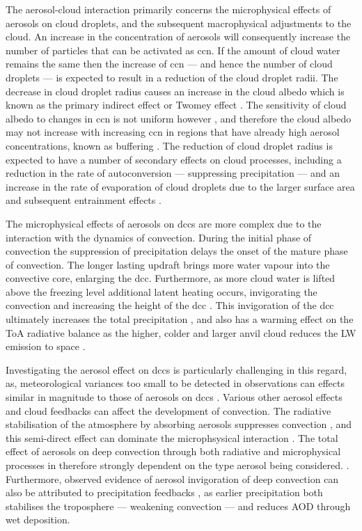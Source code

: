 The aerosol-cloud interaction primarily concerns the microphysical effects of aerosols on cloud droplets, and the subsequent macrophysical adjustments to the cloud.
An increase in the concentration of aerosols will consequently increase the number of particles that can be activated as \acrshort{ccn}.
If the amount of cloud water remains the same then the increase of \acrshort{ccn} --- and hence the number of cloud droplets --- is expected to result in a reduction of the cloud droplet radii.
The decrease in cloud droplet radius causes an increase in the cloud albedo which is known as the primary indirect effect or Twomey effect \citep{twomey_pollution_1974}.
The sensitivity of cloud albedo to changes in \acrshort{ccn} is not uniform however \citep{twomey_aerosols_1991}, and therefore the cloud albedo may not increase with increasing \acrshort{ccn} in regions that have already high aerosol concentrations, known as buffering \citep{stevens_untangling_2009}.
The reduction of cloud droplet radius is expected to have a number of secondary effects on cloud processes, including a reduction in the rate of autoconversion --- suppressing precipitation \citep{albrecht_aerosols_1989} --- and an increase in the rate of evaporation of cloud droplets due to the larger surface area and subsequent entrainment effects \citep{ackerman_impact_2004}.

The microphysical effects of aerosols on \acrshort{dcc}s are more complex due to the interaction with the dynamics of convection.
During the initial phase of convection the suppression of precipitation delays the onset of the mature phase of convection.
The longer lasting updraft brings more water vapour into the convective core, enlarging the \acrshort{dcc}.
Furthermore, as more cloud water is lifted above the freezing level additional latent heating occurs, invigorating the convection and increasing the height of the \acrshort{dcc} \citep{khain2005aerosol}.
This invigoration of the \acrshort{dcc} ultimately increases the total precipitation \citep{koren_aerosol_2005}, and also has a warming effect on the ToA radiative balance as the higher, colder and larger anvil cloud reduces the LW emission to space \citep{rosenfeld_flood_2008,fan_microphysical_2013}.

Investigating the aerosol effect on \acrshort{dcc}s is particularly challenging in this regard, as, meteorological variances too small to be detected in observations can effects similar in magnitude to those of aerosols on \acrshort{dcc}s \citep{grabowski_can_2018}.
Various other aerosol effects and cloud feedbacks can affect the development of convection.
The radiative stabilisation of the atmosphere by absorbing aerosols suppresses convection \citep{koren_smoke_2008}, and this semi-direct effect can dominate the microphsysical interaction \citep{fan_effects_2008}.
The total effect of aerosols on deep convection through both radiative and microphysical processes in therefore strongly dependent on the type aerosol being considered. \citep{jiang_contrasting_2018}.
Furthermore, observed evidence of aerosol invigoration of deep convection can also be attributed to precipitation feedbacks \citep{varble_erroneous_2018}, as earlier precipitation both stabilises the troposphere --- weakening convection --- and reduces AOD through wet deposition. 

